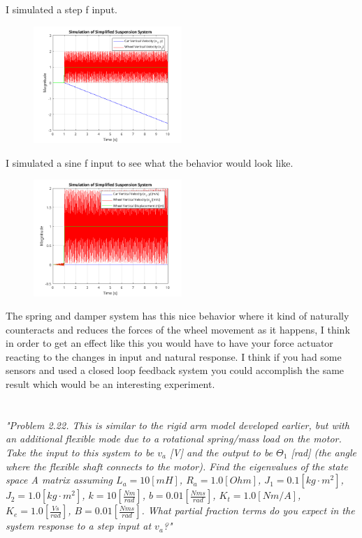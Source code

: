 \documentclass{article}
\begin{document}
I simulated a step f input.

\begin{figure}[H]
    \centering
    \includegraphics[width=0.5\textwidth]{stepSusOnlySim.png}
\end{figure}

I simulated a sine f input to see what the behavior would look like.

\begin{figure}[H]
    \centering
    \includegraphics[width=0.5\textwidth]{sinSusOnlySim.png}
\end{figure}

The spring and damper system has this nice behavior where it kind of naturally counteracts and reduces the forces of the wheel movement as it happens, I think in order to get an effect like this you would have to have your force actuator reacting to the changes in input and natural response.
I think if you had some sensors and used a closed loop feedback system you could accomplish the same result which would be an interesting experiment.

\section{}

\textit{
    "Problem 2.22. This is similar to the rigid arm model developed earlier, but with an
    additional flexible mode due to a rotational spring/mass load on the motor. Take the input
    to this system to be $v_a$ [V] and the output to be $\Theta_1$ [rad] (the angle where the flexible
    shaft connects to the motor). Find the eigenvalues of the state space A matrix assuming
    $L_a = 10 [mH]$, $R_a = 1.0 [Ohm]$, $J_1 = 0.1 [kg \cdot m^2]$, $J_2 = 1.0 [kg \cdot m^2]$, $k = 10 [\frac{Nm}{rad}]$,
    $b = 0.01 [\frac{Nms}{rad}]$, $K_t = 1.0 [Nm/A]$, $K_e = 1.0 [\frac{Vs}{rad}]$, $B = 0.01 [\frac{Nms}{rad}]$. What partial
    fraction terms do you expect in the system response to a step input at $v_a$?"
}
\end{document}
